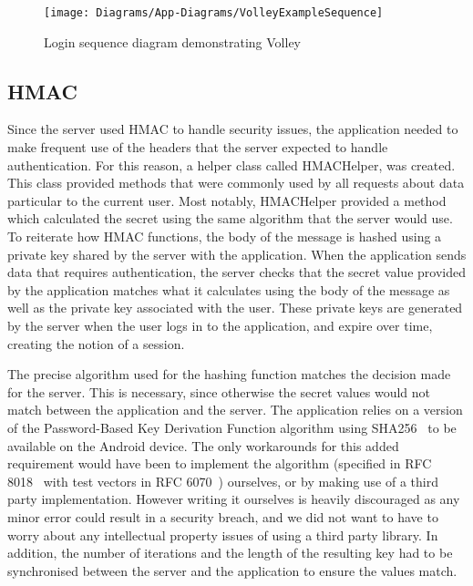\documentclass[12pt]{report}
\let\Oldsubsection\subsection
\renewcommand{\subsection}{\FloatBarrier\Oldsubsection}
\begin{document}
\begin{figure}
    \texttt{[image: Diagrams/App-Diagrams/VolleyExampleSequence]}
    \caption{Login sequence diagram demonstrating Volley}
    \label{fig:login-volley}
\end{figure}


\subsection{HMAC} \label{hmac}

Since the server used HMAC to handle security issues, the application needed to make frequent use of the headers that
the server expected to handle authentication. For this reason, a helper class called HMACHelper, was created. This
class provided methods that were commonly used by all requests about data particular to the current user. Most notably,
HMACHelper provided a method which calculated the secret using the same algorithm that the server would use. To
reiterate how HMAC functions, the body of the message is hashed using a private key shared by the server with the
application. When the application sends data that requires authentication, the server checks that the secret value
provided by the application matches what it calculates using the body of the message as well as the private key
associated with the user. These private keys are generated by the server when the user logs in to the application,
and expire over time, creating the notion of a session.

The precise algorithm used for the hashing function matches the decision made for the server. This is necessary, since
otherwise the secret values would not match between the application and the server. The application relies on a version
of the Password-Based Key Derivation Function algorithm using SHA256~\autocite{RFC4634} to be available on the Android device. The only
workarounds for this added requirement would have been to implement the algorithm (specified in RFC 8018~\autocite{RFC8018} with test
vectors in RFC 6070~\autocite{RFC6070}) ourselves, or by making use of a third party implementation. However writing it ourselves is
heavily discouraged as any minor error could result in a security breach, and we did not want to have to worry about
any intellectual property issues of using a third party library. In addition, the number of iterations and the length of
the resulting key had to be synchronised between the server and the application to ensure the values match.
\end{document}
